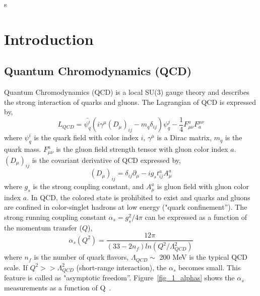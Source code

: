 s\chapter{Introduction}
\section{Quantum Chromodynamics (QCD)}
\label{sec_1_qcd}
Quantum Chromodynamics (QCD) is a local SU(3) gauge theory and describes the strong interaction of quarks and gluons. 
The Lagrangian of QCD is expressed by, 
\begin{equation}
  L_{QCD} = \bar{\psi_{q}^{i}}( i\gamma^{\mu}(D_{\mu})_{ij} - m_{q}\delta_{ij} ) \psi_{q}^{j} - \frac{1}{4}F_{\mu\nu}^{a}F_{a}^{\mu\nu}
\end{equation}
where $\psi^{i}_q$ is the quark field with color index $i$, $\gamma^{\mu}$ is a Dirac matrix, $m_{q}$ is the quark mass. 
$F^{a}_{\mu\nu}$ is the gluon field strength tensor with gluon color index $a$. 
$(D_{\mu})_{ij}$ is the covariant derivative of QCD expressed by, 
\begin{equation}
  (D_{\mu})_{ij} = \delta_{ij}\partial_{\mu} - ig_{s}t^{a}_{ij}A^{a}_{\mu}
\end{equation}
where $g_{s}$ is the strong coupling constant, and $A^{a}_{\mu}$ is gluon field with gluon color index $a$. 
In QCD, the colored state is prohibited to exist and quarks and gluons are confined in color-singlet hadrons at low energy ("quark confinement''). 
The strong running coupling constant $\alpha_{s}=g_{s}^{2}/4\pi$ can be expressed as a function of the momentum transfer ($Q$), 
\begin{equation}
  \alpha_{s}(Q^{2}) = \frac{12\pi}{(33-2n_{f})ln(Q^{2}/\Lambda^{2}_{QCD})}
\end{equation}
where $n_{f}$ is the number of quark flavors, $\Lambda_{QCD}\sim$ 200 MeV is the typical QCD scale. 
If $Q^{2} >> \Lambda_{QCD}^{2}$ (short-range interaction), the $\alpha_{s}$ becomes small. 
This feature is called as "asymptotic freedom''. 
Figure~\ref{fig_1_alphas} shows the $\alpha_{s}$ measurements as a function of Q~\cite{bib_pdg}.
